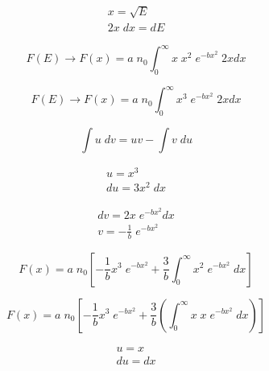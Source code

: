 \documentclass[11pt,a4paper]{article}
\begin{document}
\begin{equation*}
    \begin{gathered}
        x  = \sqrt{E}\\
        2x \; dx = dE
    \end{gathered}
\end{equation*}

\begin{equation}
    F(E) \rightarrow F(x) = a \; n_0 \int_0^\infty x \; x^2 \; e^{-bx^2} \; 2xdx
\end{equation}

\begin{equation}
    F(E) \rightarrow F(x) = a \; n_0 \int_0^\infty x^3 \; e^{-bx^2} \; 2xdx
\end{equation}

\begin{equation*}
    \int u \; dv = uv - \int v \; du
\end{equation*}

\begin{equation*}
    \begin{gathered}
        u = x^3\\
        du = 3x^2 \; dx
    \end{gathered}
\end{equation*}

\begin{equation*}
    \begin{gathered}
        dv = 2x \; e^{-bx^2} dx\\
        v = -\frac{1}{b} \; e^{-bx^2}
    \end{gathered}
\end{equation*}

\begin{equation}
    F(x) = a \; n_0 [-\frac{1}{b} x^3 \; e^{-bx^2} + \frac{3}{b} \int_0^{\infty} x^2 \; e^{-bx^2} \; dx]
\end{equation}

\begin{equation}
    F(x) = a \; n_0 [-\frac{1}{b} x^3 \; e^{-bx^2} + \frac{3}{b} (\int_0^{\infty} x \; x \; e^{-bx^2} \; dx)]
\end{equation}

\begin{equation*}
    \begin{gathered}
        u = x\\
        du = dx
    \end{gathered}
\end{equation*}
\end{document}
